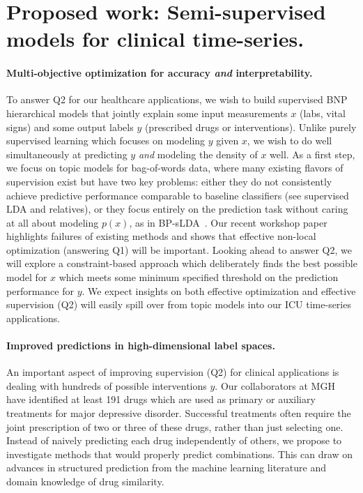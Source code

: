 \documentclass[11pt,letterpaper,sans]{article}
\begin{document}
\section{Proposed work: Semi-supervised models for clinical time-series.}

\paragraph{Multi-objective optimization for accuracy \emph{and} interpretability.}
To answer Q2 for our healthcare applications, we wish to build supervised BNP hierarchical models that jointly explain some input measurements $x$ (labs, vital signs) and some output labels $y$ (prescribed drugs or interventions).
Unlike purely supervised learning which focuses on modeling $y$ given $x$, we wish to do well simultaneously at predicting $y$ \emph{and} modeling the density of $x$ well.
As a first step, we focus on topic models for bag-of-words data, where many existing flavors of supervision exist but have two key problems: either they do not consistently achieve predictive performance comparable to baseline classifiers (see supervised LDA \citep{blei2007sLDA} and relatives), or they focus entirely on the prediction task without caring at all about modeling $p(x)$, as in BP-sLDA~\citep{chen2015bplda}. 
Our recent workshop paper
\citep{hughes2016clinicalSLDA} highlights failures of existing methods and shows that effective non-local optimization (answering Q1) will be important. Looking ahead to answer Q2, we will explore a constraint-based approach which deliberately finds the best possible model for $x$ which meets some minimum specified threshold on the prediction performance for $y$. We expect insights on both effective optimization and effective supervision (Q2) will easily spill over from topic models into our ICU time-series applications.


\paragraph{Improved predictions in high-dimensional label spaces.}
An important aspect of improving supervision (Q2) for clinical applications
is dealing with hundreds of possible interventions $y$. Our collaborators at MGH have identified at least 191 drugs which are used as primary or auxiliary treatments for major depressive disorder. Successful treatments often require the joint prescription of two or three of these drugs, rather than just selecting one. 
Instead of naively predicting each drug independently of others, we propose to investigate methods that would properly predict combinations. This can draw on advances in structured prediction from the machine learning literature and domain knowledge of drug similarity.
\end{document}
